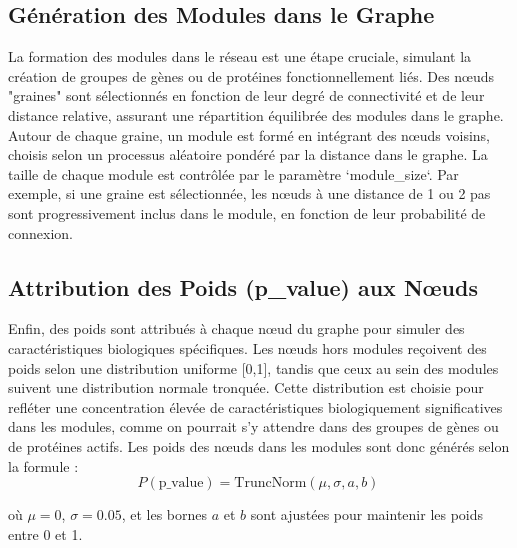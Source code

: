 \subsection{Génération des Modules dans le Graphe }

La formation des modules dans le réseau est une étape cruciale, simulant la création de groupes de gènes ou de protéines fonctionnellement liés. Des nœuds "graines" sont sélectionnés en fonction de leur degré de connectivité et de leur distance relative, assurant une répartition équilibrée des modules dans le graphe. Autour de chaque graine, un module est formé en intégrant des nœuds voisins, choisis selon un processus aléatoire pondéré par la distance dans le graphe. La taille de chaque module est contrôlée par le paramètre `module\_size`. Par exemple, si une graine est sélectionnée, les nœuds à une distance de 1 ou 2 pas sont progressivement inclus dans le module, en fonction de leur probabilité de connexion.

\subsection{ Attribution des Poids (p\_value) aux Nœuds}

Enfin, des poids sont attribués à chaque nœud du graphe pour simuler des caractéristiques biologiques spécifiques. Les nœuds hors modules reçoivent des poids selon une distribution uniforme [0,1], tandis que ceux au sein des modules suivent une distribution normale tronquée. Cette distribution est choisie pour refléter une concentration élevée de caractéristiques biologiquement significatives dans les modules, comme on pourrait s'y attendre dans des groupes de gènes ou de protéines actifs. Les poids des nœuds dans les modules sont donc générés selon la formule :
    \begin{equation}
         P(\text{p\_value}) = \text{TruncNorm}(\mu, \sigma, a, b) \
    \end{equation}
    
    où \(\mu = 0\), \(\sigma = 0.05\), et les bornes \(a\) et \(b\) sont ajustées pour maintenir les poids entre 0 et 1.
    
